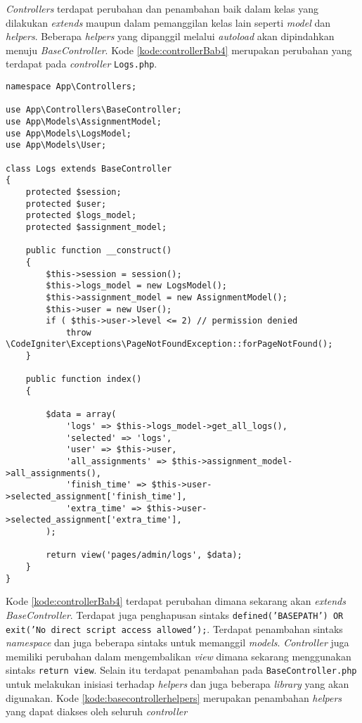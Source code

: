 \textit{Controllers} terdapat perubahan dan penambahan baik dalam kelas yang dilakukan \textit{extends} maupun dalam pemanggilan kelas lain seperti \textit{model} dan \textit{helpers}. Beberapa \textit{helpers} yang dipanggil melalui \textit{autoload} akan dipindahkan menuju \textit{BaseController}. Kode \ref{kode:controllerBab4} merupakan perubahan yang terdapat pada \textit{controller} \texttt{Logs.php}.

\begin{lstlisting}[caption=Perubahan kode \textit{controller} \texttt{Logs.php} pada \textit{CodeIgniter 4}, label=kode:controllerBab4]
namespace App\Controllers;

use App\Controllers\BaseController;
use App\Models\AssignmentModel;
use App\Models\LogsModel;
use App\Models\User;

class Logs extends BaseController
{
	protected $session;
	protected $user;
	protected $logs_model;
	protected $assignment_model;

	public function __construct()
	{
		$this->session = session();
		$this->logs_model = new LogsModel();
		$this->assignment_model = new AssignmentModel();
		$this->user = new User();
		if ( $this->user->level <= 2) // permission denied
			throw \CodeIgniter\Exceptions\PageNotFoundException::forPageNotFound();
	}
	
	public function index()
	{

		$data = array(
			'logs' => $this->logs_model->get_all_logs(),
			'selected' => 'logs',
			'user' => $this->user,
			'all_assignments' => $this->assignment_model->all_assignments(),
			'finish_time' => $this->user->selected_assignment['finish_time'],
			'extra_time' => $this->user->selected_assignment['extra_time'],
		);

		return view('pages/admin/logs', $data);
	}
}
\end{lstlisting}

Kode \ref{kode:controllerBab4} terdapat perubahan dimana sekarang akan \textit{extends} \textit{BaseController}. Terdapat juga penghapusan sintaks \texttt{defined('BASEPATH') OR exit('No direct script access allowed');}. Terdapat penambahan sintaks \textit{namespace} dan juga beberapa sintaks untuk memanggil \textit{models}. \textit{Controller} juga memiliki perubahan dalam mengembalikan \textit{view} dimana sekarang menggunakan sintaks \texttt{return view}. Selain itu terdapat penambahan pada \texttt{BaseController.php} untuk melakukan inisiasi terhadap \textit{helpers} dan juga beberapa \textit{library} yang akan digunakan. Kode \ref{kode:basecontrollerhelpers} merupakan penambahan \textit{helpers} yang dapat diakses oleh seluruh \textit{controller}


